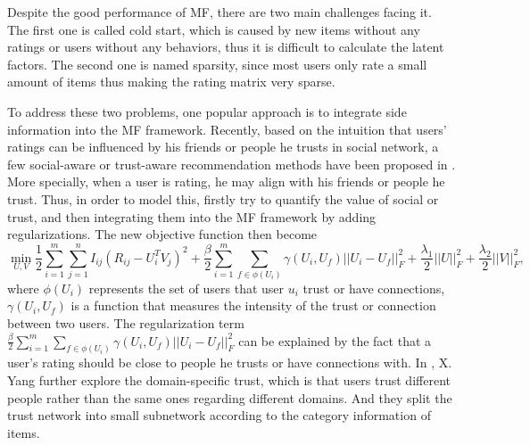 Despite the good performance of MF, there are two main challenges facing it. The first one is called cold start, which is caused by new items without any ratings or users without any behaviors, thus it is difficult to calculate the latent factors. 
The second one is named sparsity, since most users only rate a small amount of items thus making the rating matrix very sparse.

To address these two problems, one popular approach is to integrate side information into the MF framework. Recently, based on the intuition that users' ratings can be influenced by his friends or people he trusts in social network, a few social-aware or trust-aware recommendation methods have been proposed in \cite{jamali2010matrix}\cite{ma2009llearningEnsembel}\cite{ma2009learningTrust}\cite{ma2008sorec}\cite{ma2011recommender}\cite{massa2004trust}\cite{yang2013social}. More specially, when a user is rating, he may align with his friends or people he trust. Thus, in order to model this, \cite{jamali2010matrix}\cite{ma2009llearningEnsembel}\cite{ma2009learningTrust}\cite{ma2008sorec}\cite{ma2011recommender}\cite{massa2004trust} firstly try to quantify the value of social or trust, and then integrating them into the MF framework by adding regularizations. The new objective function then become
\begin{equation}
\min_{U,V}\frac{1}{2}\sum_{i=1}^{m}\sum_{j=1}^{n}I_{ij}(R_{ij} - U_i^TV_j)^2 + \frac{\beta}{2}\sum_{i=1}^{m}\sum_{f \in \phi(U_i)}\gamma(U_i, U_f)||U_i - U_f||_F^2 + \frac{\lambda_1}{2}||U||_F^2 + \frac{\lambda_2}{2}||V||_F^2,
\end{equation} 
where $\phi(U_i)$ represents the set of users that user $u_i$ trust or have connections, $\gamma(U_i,U_f)$ is a function that measures the intensity of the trust or connection between two users. The regularization term $\frac{\beta}{2}\sum_{i=1}^{m}\sum_{f \in \phi(U_i)}\gamma(U_i, U_f)||U_i - U_f||_F^2$ can be explained by the fact that a user's rating should be close to people he trusts or have connections with. In \cite{yang2012circle}, X. Yang further explore the domain-specific trust, which is that users trust different people rather than the same ones regarding different domains. And they split the trust network into small subnetwork according to the category information of items. 

